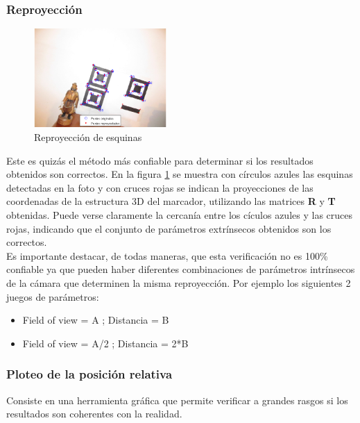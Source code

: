\documentclass[main]{subfiles}
\begin{document}
\subsubsection*{Reproyección}

\begin{figure}
	\begin{center}
	\vspace{-20pt}
		\includegraphics[width=0.45\textwidth]{./pics_camara/resultado_rp.png}
	\end{center}
	\caption{Reproyección de esquinas}
	\label{fig:resultado_rp}
\end{figure}

Este es quizás el método más confiable para determinar si los resultados obtenidos son correctos. En la figura \ref{fig:resultado_rp} se muestra con círculos azules las esquinas detectadas en la foto y con cruces rojas se indican la proyecciones de las coordenadas de la estructura 3D del marcador, utilizando las matrices \textbf{R} y \textbf{T} obtenidas. Puede verse claramente la cercanía entre los cículos azules y las cruces rojas, indicando que el conjunto de parámetros extrínsecos obtenidos son los correctos.\\

Es importante destacar, de todas maneras, que esta verificación no es 100\% confiable ya que pueden haber diferentes combinaciones de parámetros intrínsecos de la cámara que determinen la misma reproyección. Por ejemplo los siguientes 2 juegos de parámetros:
\begin{itemize}
\item Field of view = A   ; Distancia = B
\item Field of view = A/2 ; Distancia = 2*B
\end{itemize}

\subsubsection*{Ploteo de la posición relativa}

Consiste en una herramienta gráfica que permite verificar a grandes rasgos si los resultados son coherentes con la realidad.\\
 
\end{document}
